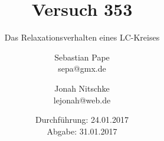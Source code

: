 

\title{Versuch 353}
\subtitle{Das Relaxationsverhalten eines LC-Kreises}
\author{Sebastian Pape\\
        sepa@gmx.de \and
        Jonah Nitschke\\
        lejonah@web.de}
\date{Durchführung: 24.01.2017\\
      Abgabe: 31.01.2017}


\maketitle
\setcounter{page}{1}


